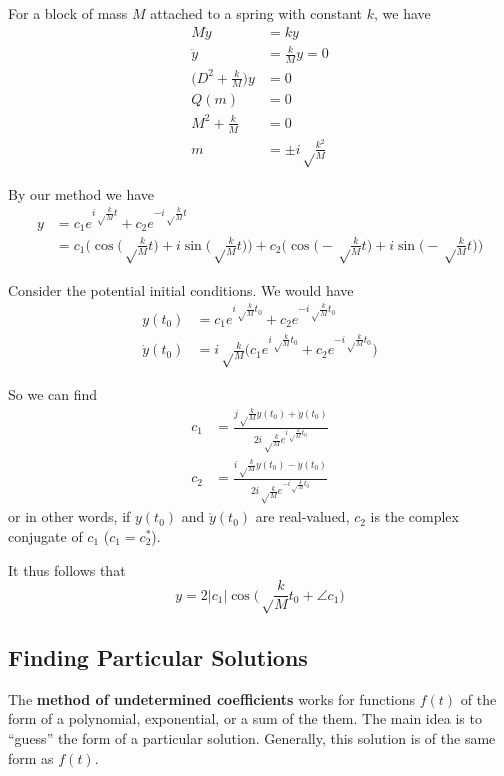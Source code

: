 \documentclass[12pt]{article}
\begin{document}
\begin{example}
For a block of mass $M$ attached to a spring with constant $k$, we have
\begin{align*}
M\ddot y &= ky\\
\ddot y &= \frac{k}{M}y = 0\\
\bigg(D^2 + \frac{k}{M}\bigg)y &= 0\\
Q(m) &= 0\\
M^2 + \frac{k}{M} &= 0\\
m &= \pm i\sqrt\frac{k^2}{M}
\end{align*}

By our method we have
\begin{align*}
y &= c_1 e^{i\sqrt\frac{k}{M} t} + c_2 e^{-i\sqrt\frac{k}{M} t}\\
&= c_1\bigg( \cos\bigl(\sqrt\frac{k}{M} t\bigl) + i\sin\bigl(\sqrt\frac{k}{M} t\bigl)\bigg) + c_2 \bigg(\cos\bigl(-\sqrt\frac{k}{M} t\bigl) + i\sin\bigl(-\sqrt\frac{k}{M} t\bigl)\bigg)
\end{align*}

Consider the potential initial conditions. We would have
\begin{align*}
y(t_0) &= c_1 e^{i\sqrt\frac{k}{M} t_0} + c_2 e^{-i\sqrt\frac{k}{M} t_0}\\
\dot y(t_0) &= i\sqrt\frac{k}{M} \bigg(c_1 e^{i\sqrt\frac{k}{M} t_0} + c_2 e^{-i\sqrt\frac{k}{M} t_0}\bigg)
\end{align*}

So we can find
\begin{align*}
c_1 &= \frac{j\sqrt\frac{k}{M} y(t_0) + \dot y(t_0)}{2i\sqrt\frac{k}{M} e^{i\sqrt\frac{k}{M} t_0}}\\
c_2 &= \frac{i\sqrt\frac{k}{M} y(t_0) - \dot y(t_0)}{2i\sqrt\frac{k}{M} e^{-i\sqrt\frac{k}{M} t_0}}
\end{align*}
or in other words, if $y(t_0)$ and $\dot y(t_0)$ are real-valued, $c_2$ is the complex conjugate of $c_1$ ($c_1 = c_2^*$).

It thus follows that \[ y = 2 |c_1| \cos\bigg(\sqrt\frac{k}{M} t_0 + \angle c_1\bigg) \]
\end{example}

\subsection{Finding Particular Solutions}
The {\bf method of undetermined coefficients} works for functions $f(t)$ of the form of a polynomial, exponential, or a sum of the them. The main idea is to ``guess'' the form of a particular solution. Generally, this solution is of the same form as $f(t)$.
\end{document}
